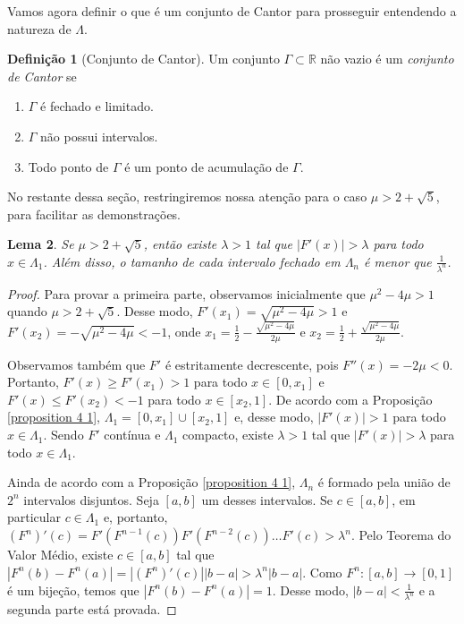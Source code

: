 \documentclass[a4paper, 12pt]{article}
\theoremstyle{definition}
\newtheorem{definition}{Definição}[section]
\theoremstyle{plain}
\theoremstyle{plain}
\newtheorem{lemma}[definition]{Lema}
\theoremstyle{plain}
\theoremstyle{remark}
\newcommand{\RR}{\mathbb{R}}
\begin{document}
Vamos agora definir o que é um conjunto de Cantor para prosseguir entendendo a natureza de $\Lambda$.

\begin{definition}[Conjunto de Cantor]
Um conjunto $\Gamma \subset \RR$ não vazio é um \textit{conjunto de Cantor} se
\begin{enumerate}
\item $\Gamma$ é fechado e limitado.
\item $\Gamma$ não possui intervalos.
\item Todo ponto de $\Gamma$ é um ponto de acumulação de $\Gamma$.
\end{enumerate}
\end{definition}

No restante dessa seção, restringiremos nossa atenção para o caso $\mu > 2 + \sqrt{5}$, para facilitar as demonstrações.

\begin{lemma}
\label{lemma 4 1}
Se $\mu > 2 + \sqrt{5}$, então existe $\lambda > 1$ tal que $|F'(x)| > \lambda$ para todo $x \in \Lambda_1$. Além disso, o tamanho de cada intervalo fechado em $\Lambda_n$ é menor que $\frac{1}{\lambda^n}$.
\end{lemma}

\begin{proof}
Para provar a primeira parte, observamos inicialmente que $\mu^2 - 4\mu > 1$ quando $\mu > 2 + \sqrt{5}$. Desse modo, $F'(x_1) = \sqrt{\mu^2 - 4\mu} > 1$ e $F'(x_2) = -\sqrt{\mu^2 - 4\mu} < -1$, onde $x_1 = \frac{1}{2} - \frac{\sqrt{\mu^2 - 4\mu}}{2\mu}$ e $x_2 = \frac{1}{2} + \frac{\sqrt{\mu^2 - 4\mu}}{2\mu}$.

Observamos também que $F'$ é estritamente decrescente, pois $F''(x) = -2\mu < 0$.  Portanto, $F'(x) \geq F'(x_1) > 1$ para todo $x \in [0, x_1]$ e $F'(x) \leq F'(x_2) < -1$ para todo $x \in [x_2, 1]$. De acordo com a Proposição \ref{proposition 4 1}, $\Lambda_1 = [0, x_1] \cup [x_2, 1]$ e, desse modo, $|F'(x)| > 1$ para todo $x \in \Lambda_1$. Sendo $F'$ contínua e $\Lambda_1$ compacto, existe $\lambda > 1$ tal que $|F'(x)| > \lambda$ para todo $x \in \Lambda_1$.

Ainda de acordo com a Proposição \ref{proposition 4 1}, $\Lambda_n$ é formado pela união de $2^n$ intervalos disjuntos. Seja $[a, b]$ um desses intervalos. Se $c \in [a, b]$, em particular $c \in \Lambda_1$ e, portanto, $(F^n)'(c) = F'(F^{n-1}(c)) F'(F^{n-2}(c)) \dots F'(c) > \lambda^n$. Pelo Teorema do Valor Médio, existe $c \in [a, b]$ tal que $|F^n(b) - F^n(a)| = |(F^n)'(c)||b - a| > \lambda^n|b - a|$. Como $F^n: [a, b] \rightarrow [0 ,1]$ é um bijeção, temos que $|F^n(b) - F^n(a)| = 1$. Desse modo, $|b - a| < \frac{1}{\lambda^n}$ e a segunda parte está provada.
\end{proof} 
\end{document}

